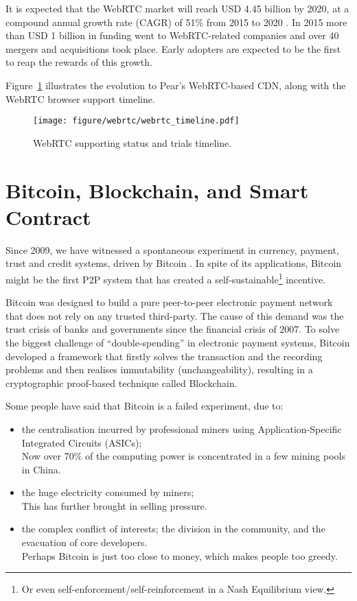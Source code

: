 It is expected that the WebRTC market will reach USD 4.45 billion by 2020, at a compound annual growth rate (CAGR) of 51\% from 2015 to 2020 \cite{webrtc-market}. In 2015 more than USD 1 billion in funding went to WebRTC-related companies and over 40 mergers and acquisitions took place. Early adopters are expected to be the first to reap the rewards of this growth. 

Figure~\ref{fig:webrtc-timeline} illustrates the evolution to Pear's WebRTC-based CDN, along with the WebRTC browser support timeline.  
\begin{figure}[ht]
	\centering
	\texttt{[image: figure/webrtc/webrtc\_timeline.pdf]}
	\caption{WebRTC supporting status and trials timeline.}\label{fig:webrtc-timeline}
\end{figure}

\section{Bitcoin, Blockchain, and Smart Contract}
Since 2009, we have witnessed a spontaneous experiment in currency, payment, trust and credit systems, driven by Bitcoin \cite{nakamoto2009bitcoin}. In spite of its applications, Bitcoin might be the first P2P system that has created a self-sustainable\footnote{Or even self-enforcement/self-reinforcement in a Nash Equilibrium view.} incentive. 

Bitcoin was designed to build a pure peer-to-peer electronic payment network that does not rely on any trusted third-party. The cause of this demand was the trust crisis of banks and governments since the financial crisis of 2007. To solve the biggest challenge of ``double-spending'' in electronic payment systems, Bitcoin developed a framework that firstly solves the transaction and the recording problems and then realises immutability (unchangeability), resulting in a cryptographic proof-based technique called Blockchain. 

Some people have said that Bitcoin is a failed experiment, due to:
\begin{itemize}
	\item the centralisation incurred by professional miners using Application-Specific Integrated Circuits (ASICs);\\
	Now over 70\% of the computing power is concentrated in a few mining pools in China. 
	\item the huge electricity consumed by miners;\\
	This has further brought in selling pressure. 
	\item  the complex conflict of interests; the division in the community, and the evacuation of core developers.\\
	Perhaps Bitcoin is just too close to money, which makes people too greedy. 
\end{itemize}

